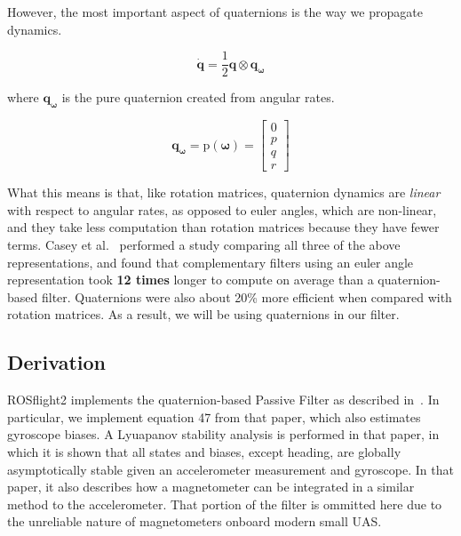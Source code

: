 \documentclass[paper=a4, fontsize=11pt]{scrartcl} %
\numberwithin{equation}{section} %
\numberwithin{figure}{section} %
\numberwithin{table}{section} %
\begin{document}
However, the most important aspect of quaternions is the way we propagate dynamics.

\begin{equation}
	\dot{\bm{q}} = \frac{1}{2} \bm{q} \otimes \bm{q_{\omega}}
\end{equation}

where $\bm{q_{\omega}}$ is the pure quaternion created from angular rates.

\begin{equation}
	\bm{q_{\omega}} = \textrm{p}(\bm{\omega}) =
			  \begin{bmatrix}
				0 \\
				p \\
				q \\
				r 
			 \end{bmatrix} 
\end{equation}

What this means is that, like rotation matrices, quaternion dynamics are \textit{linear} with respect to angular rates, as opposed to euler angles, which are non-linear, and they take less computation than rotation matrices because they have fewer terms.  Casey et al.~\cite{Casey2013} performed a study comparing all three of the above representations, and found that complementary filters using an euler angle representation took \textbf{12 times} longer to compute on average than a quaternion-based filter.  Quaternions were also about 20\% more efficient when compared with rotation matrices.  As a result, we will be using quaternions in our filter.

\subsection{Derivation}

ROSflight2 implements the quaternion-based Passive Filter as described in~\cite{Mahony2007}.  In particular, we implement equation 47 from that paper, which also estimates gyroscope biases.  A Lyuapanov stability analysis is performed in that paper, in which it is shown that all states and biases, except heading, are globally asymptotically stable given an accelerometer measurement and gyroscope.  In that paper, it also describes how a magnetometer can be integrated in a similar method to the accelerometer.  That portion of the filter is ommitted here due to the unreliable nature of magnetometers onboard modern small UAS.
\end{document}
